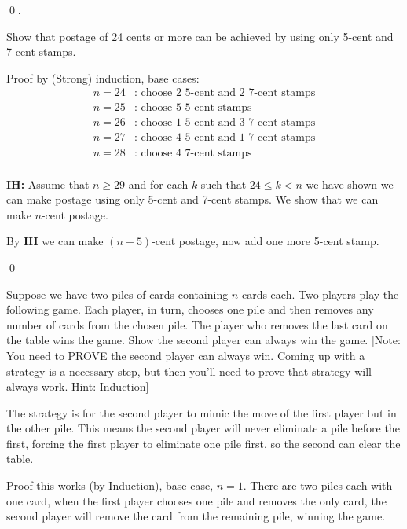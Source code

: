 \documentclass[addpoints]{exam}
\begin{document}
\begin{questions}
\begin{solution}
    \qed.
  \end{solution}

  \question[10] Show that postage of 24 cents or more can be achieved by using
  only 5-cent and 7-cent stamps.

  \begin{solution}
    Proof by (Strong) induction, base cases:
    \begin{align*}
      n = 24&: \text{ choose 2 5-cent and 2 7-cent stamps}\\
      n = 25&: \text{ choose 5 5-cent stamps}\\
      n = 26&: \text{ choose 1 5-cent and 3 7-cent stamps}\\
      n = 27&: \text{ choose 4 5-cent and 1 7-cent stamps}\\
      n = 28&: \text{ choose 4 7-cent stamps}\\
    \end{align*}

    \textbf{IH:} Assume that $n\geq 29$ and for each $k$ such that $24 \leq k <
    n$ we have shown we can make postage using only 5-cent and 7-cent stamps. We
    show that we can make $n$-cent postage.

    By \textbf{IH} we can make $(n-5)$-cent postage, now add one more 5-cent
    stamp.

    \qed
  \end{solution}

  \question[20] Suppose we have two piles of cards containing $n$ cards each.
  Two players play the following game. Each player, in turn, chooses one pile
  and then removes any number of cards from the chosen pile. The player who
  removes   the last card on the table wins the game. Show the second player can
  always   win the game. [Note: You need to PROVE the second player can always
  win.   Coming up with a strategy is a necessary step, but then you'll need to
  prove   that strategy will always work. Hint: Induction]

  \begin{solution}
    The strategy is for the second player to mimic the move of the first player
    but in the other pile. This means the second player will never eliminate a
    pile before the first, forcing the first player to eliminate one pile first,
    so the second can clear the table.

    Proof this works (by Induction), base case, $n=1$. There are two piles each
    with one card, when the first player chooses one pile and removes the only
    card, the second player will remove the card from the remaining pile,
    winning the game.


\end{solution}
\end{questions}
\end{document}
